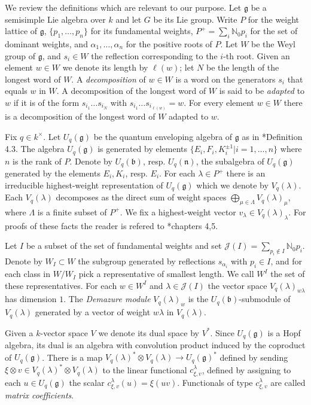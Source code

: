 \documentclass[11pt,fleqn]{article}
\theoremstyle{plain}
\theoremstyle{remark}
\theoremstyle{definition}
\newcommand\NN{\mathbb N}
\newcommand\ot{\otimes}
\renewcommand\to{\longrightarrow}
\newcommand\g{\mathfrak g}
\begin{document}
We review the definitions which are relevant to our purpose. Let $\g$ be a semisimple Lie
algebra over $k$ and let $G$ be its Lie group. Write $P$ for the weight lattice of $\g$, 
$\{p_1, \ldots, p_n\}$ for its
fundamental weights, $P^+ = \sum_i \NN_0 p_i$ for the set of dominant weights, and
$\alpha_1, \ldots,\alpha_n$ for the positive roots of $P$. Let $W$ be the Weyl group of
$\g$, and $s_i \in W$ the reflection corresponding to the $i$-th root. Given an element $w
\in W$ we denote its length by $\ell(w)$; let $N$ be the length of the longest word of
$W$. A \emph{decomposition} of $w \in W$ is a word on the generators $s_i$ that equals $w$
in $W$. A decomposition of the longest word of $W$ is said to be \emph{adapted} to $w$ if
it is of the form $s_{i_1} \ldots s_{i_N}$ with $s_{i_1} \ldots s_{i_{\ell(w)}} = w$. For
every element $w \in W$ there is a decomposition of the longest word of $W$ adapted to
$w$.

Fix $q \in k^\times$. Let $U_q(\g)$ be the quantum enveloping algebra of $\g$ as in
\cite{J}*{Definition 4.3}. The algebra $U_q(\g)$ is generated by elements $\{E_i, F_i,
K_i^{\pm 1}|i = 1, \ldots, n \}$ where $n$ is the rank of $P$. Denote by $U_q(\mathfrak b)$,
resp. $U_q(\mathfrak n)$, the subalgebra of $U_q(\g)$ generated by the elements $E_i, K_i$,
resp. $E_i$. For each $\lambda \in P^+$ there is an irreducible highest-weight
representation of $U_q(\g)$ which we denote by $V_q(\lambda)$. Each $V_q(\lambda)$
decomposes as the direct sum of weight spaces $\bigoplus_{\mu \in \Lambda}
V_q(\lambda)_\mu$, where $\Lambda$ is a finite subset of $P^+$. We fix a highest-weight 
vector $v_\lambda \in V_q(\lambda)_\lambda$. For proofs of these facts the reader is
refered to \cite{J}*{chapters 4,5}.

Let $I$ be a subset of the set of fundamental weights and set $\mathcal J(I) = \sum_{p_i
\notin I} \NN_0 p_i$. Denote by $W_I \subset W$ the subgroup generated by reflections
$s_{\alpha_i}$ with $p_i \in I$, and for each class in $W/W_I$ pick a representative of
smallest length. We call $W^I$ the set of these representatives. For each $w \in W^I$ and
$\lambda \in \mathcal J(I)$ the vector space $V_q(\lambda)_{w\lambda}$ has dimension $1$.
The \emph{Demazure module} $V_q(\lambda)_w$ is the $U_q(\mathfrak b)$-submodule of
$V_q(\lambda)$ generated by a vector of  weight $w\lambda$ in $V_q(\lambda)$.

Given a $k$-vector space $V$ we denote its dual space by $V^*$. Since $U_q(\g)$ is a Hopf
algebra, its dual is an algebra with convolution product induced by the coproduct of
$U_q(\g)$. There is a map $V_q(\lambda)^* \ot V_q(\lambda) \to U_q(\g)^*$ defined by
sending $\xi \ot v \in V_q(\lambda)^* \ot V_q(\lambda)$ to the linear functional
$c^\lambda_{\xi,v}$, defined by assigning to each $u \in U_q(\g)$ the scalar
$c^\lambda_{\xi,v}(u) = \xi(uv)$. Functionals of type $c^\lambda_{\xi,v}$ are called
\emph{matrix coefficients}.
\end{document}
